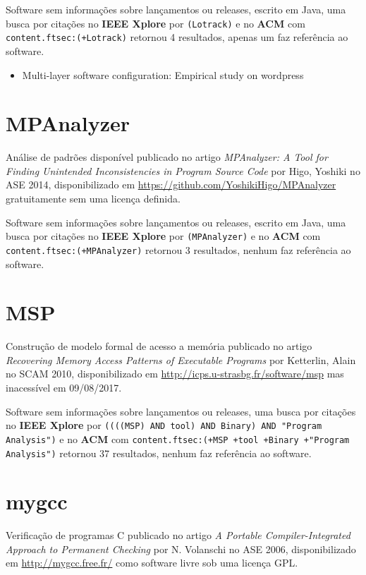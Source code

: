 Software sem informações sobre lançamentos ou releases,
escrito em Java,
uma busca por citações no {\bf IEEE Xplore} por
\texttt{(Lotrack)}
e no {\bf ACM} com
\texttt{content.ftsec:(+Lotrack)}
retornou
4 resultados,
apenas um faz referência ao software.

\begin{itemize}
\item Multi-layer software configuration: Empirical study on wordpress
\end{itemize}


\section{MPAnalyzer}

Análise de padrões disponível
publicado no artigo {\it MPAnalyzer: A Tool for Finding Unintended Inconsistencies in Program Source Code}
por Higo, Yoshiki
no ASE 2014,
disponibilizado em \url{https://github.com/YoshikiHigo/MPAnalyzer}
gratuitamente
sem uma licença definida.

Software sem informações sobre lançamentos ou releases,
escrito em Java,
uma busca por citações no {\bf IEEE Xplore} por
\texttt{(MPAnalyzer)}
e no {\bf ACM} com
\texttt{content.ftsec:(+MPAnalyzer)}
retornou
3 resultados,
nenhum faz referência ao software.



\section{MSP}

Construção de modelo formal de acesso a memória
publicado no artigo {\it Recovering Memory Access Patterns of Executable Programs}
por Ketterlin, Alain
no SCAM 2010,
disponibilizado em \url{http://icps.u-strasbg.fr/software/msp}
mas inacessível em 09/08/2017.

Software sem informações sobre lançamentos ou releases,
uma busca por citações no {\bf IEEE Xplore} por
\texttt{((((MSP) AND tool) AND Binary) AND "Program Analysis")}
e no {\bf ACM} com
\texttt{content.ftsec:(+MSP +tool +Binary +"Program Analysis")}
retornou
37 resultados,
nenhum faz referência ao software.



\section{mygcc}

Verificação de programas C
publicado no artigo {\it A Portable Compiler-Integrated Approach to Permanent Checking}
por N. Volanschi
no ASE 2006,
disponibilizado em \url{http://mygcc.free.fr/}
como software livre
sob uma licença GPL.

